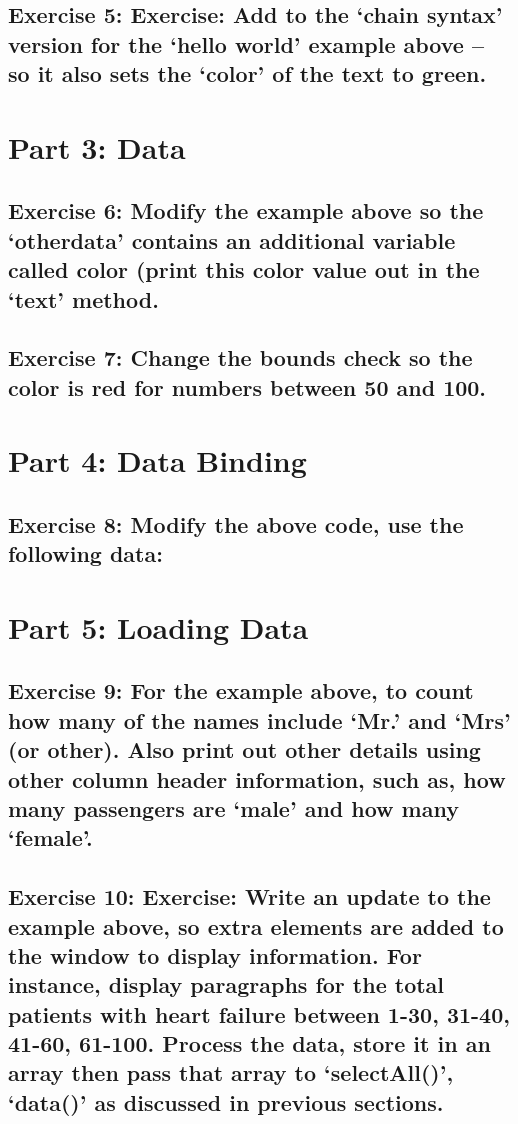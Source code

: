 \documentclass[11pt]{article}   	%
\begin{document}
\subsection{Exercise 5: Exercise: Add to the ‘chain syntax’ version for the ‘hello world’ example above – so it also sets the ‘color’ of the text to green.}


\section{Part 3: Data}
\subsection{Exercise 6: Modify the example above so the ‘otherdata’ contains an additional variable called color (print this color value out in the ‘text’ method.}
\subsection{Exercise 7: Change the bounds check so the color is red for numbers between 50 and 100.}

\section{Part 4: Data Binding}
\subsection{Exercise 8: Modify the above code, use the following data:}

\section{Part 5: Loading Data}
\subsection{Exercise 9: For the example above, to count how many of the names include ‘Mr.’ and ‘Mrs’ (or other). Also print out other details using other column header information, such as, how many passengers are ‘male’ and how many ‘female’.}
\subsection{Exercise 10: Exercise: Write an update to the example above, so extra elements are added to the window to display information. For instance, display paragraphs for the total patients with heart failure between 1-30, 31-40, 41-60, 61-100. Process the data, store it in an array then pass that array to ‘selectAll()’, ‘data()’ as discussed in previous sections.}
\end{document}
